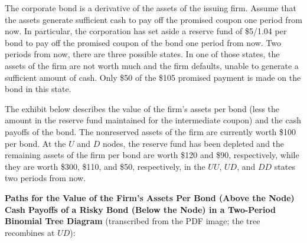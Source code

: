 \documentclass[11pt,a4paper]{article}
\begin{document}
The corporate bond is a derivative of the assets of the issuing firm. Assume that the assets
generate sufficient cash to pay off the promised coupon one period from now. In particular, the
corporation has set aside a reserve fund of \$5/1.04 per bond to pay off the promised coupon of the
bond one period from now. Two periods from now, there are three possible states. In one of those
states, the assets of the firm are not worth much and the firm defaults, unable to generate a
sufficient amount of cash. Only \$50 of the \$105 promised payment is made on the bond in this
state.

The exhibit below describes the value of the firm's assets per bond (less the amount in the reserve
fund maintained for the intermediate coupon) and the cash payoffs of the bond. The nonreserved
assets of the firm are currently worth \$100 per bond. At the \(U\) and \(D\) nodes, the reserve
fund has been depleted and the remaining assets of the firm per bond are worth \$120 and \$90,
respectively, while they are worth \$300, \$110, and \$50, respectively, in the \(UU\), \(UD\), and
\(DD\) states two periods from now.

\textbf{Paths for the Value of the Firm's Assets Per Bond (Above the Node) Cash Payoffs of a Risky
Bond (Below the Node) in a Two-Period Binomial Tree Diagram} (transcribed from the PDF image; the
tree recombines at \(UD\)):
\end{document}
